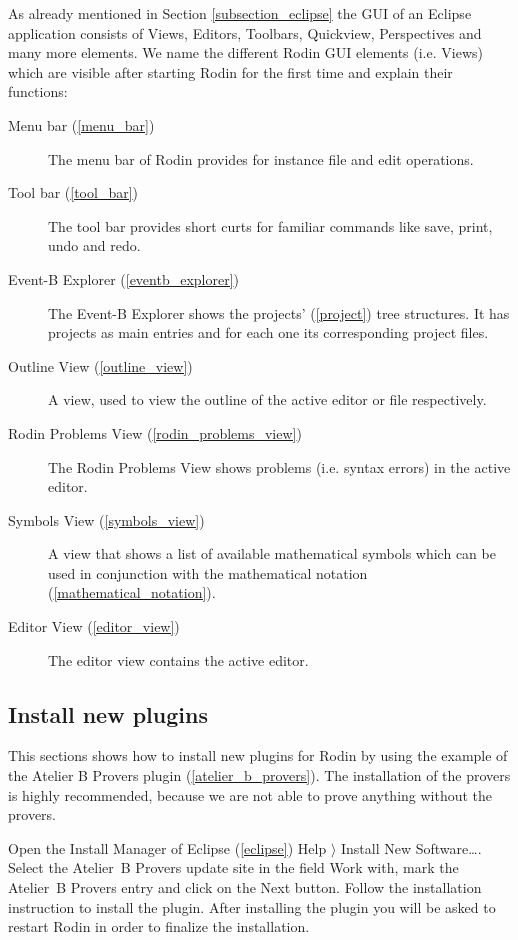 As already mentioned in Section \ref{subsection_eclipse} the GUI of an Eclipse application consists of Views, Editors, Toolbars, Quickview, Perspectives and many more elements. We name the different Rodin GUI elements (i.e. Views) which are visible after starting Rodin for the first time and explain their functions:

\begin{description}
	\item[Menu bar (\ref{menu_bar})] The menu bar of Rodin provides for instance file and edit operations.
	\item[Tool bar (\ref{tool_bar})] The tool bar provides short curts for familiar commands like save, print, undo and redo.
	\item[Event-B Explorer (\ref{eventb_explorer})] The Event-B Explorer shows the projects' (\ref{project}) tree structures. It has projects as main entries and for each one its corresponding project files.
	\item[Outline View (\ref{outline_view})] A view, used to view the outline of the active editor or file respectively.
	\item[Rodin Problems View (\ref{rodin_problems_view})] The Rodin Problems View shows problems (i.e. syntax errors) in the active editor.
	\item[Symbols View (\ref{symbols_view})] A view that shows a list of available mathematical symbols which can be used in conjunction with the mathematical notation (\ref{mathematical_notation}).
	\item[Editor View (\ref{editor_view})] The editor view contains the active editor.
\end{description}

\subsection{Install new plugins}

This sections shows how to install new plugins for Rodin by using the example of the Atelier B Provers plugin (\ref{atelier_b_provers}). The installation of the provers is highly recommended, because we are not able to prove anything without the provers.

Open the Install Manager of Eclipse (\ref{eclipse}) \textsf{Help $\rangle$ Install New Software\ldots}. Select the Atelier~B Provers update site in the field \textsf{Work with}, mark the Atelier~B Provers entry and click on the \textsf{Next} button. Follow the installation instruction to install the plugin. After installing the plugin you will be asked to restart Rodin in order to finalize the installation.


